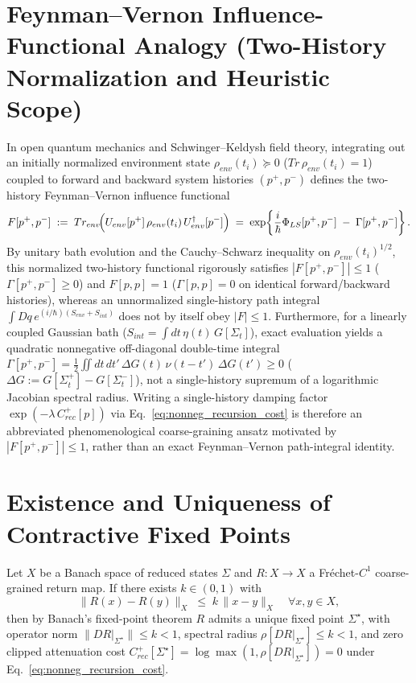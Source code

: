 \documentclass[american,11pt,letterpaper]{article}
\def\mathcal#1{#1}%
\def\mathrm#1{#1}%
\def\emph#1{#1}%
\begin{document}
\section{Feynman--Vernon Influence-Functional Analogy (Two-History Normalization and Heuristic Scope)}
\label{appendix:FV-recursion}
In open quantum mechanics and Schwinger--Keldysh field theory, integrating out an initially normalized environment state $\rho_{\mathrm{env}}(t_i) \succeq 0$ ($\mathrm{Tr}\,\rho_{\mathrm{env}}(t_i) = 1$) coupled to forward and backward system histories $(p^+, p^-)$ defines the \emph{two-history} Feynman--Vernon influence functional
\[
\mathcal{F}[p^+, p^-] \;:=\; \mathrm{Tr}_{\mathrm{env}}\!\Bigl(U_{\mathrm{env}}[p^+]\,\rho_{\mathrm{env}}(t_i)\,U_{\mathrm{env}}^\dagger[p^-]\Bigr)
\;=\; \exp\!\left\{\frac{i}{\hbar}\Phi_{\mathrm{LS}}[p^+, p^-] \;-\; \Gamma[p^+, p^-]\right\}.
\]
By unitary bath evolution and the Cauchy--Schwarz inequality on $\rho_{\mathrm{env}}(t_i)^{1/2}$, this normalized two-history functional rigorously satisfies $|\mathcal{F}[p^+, p^-]| \le 1$ ($\Gamma[p^+, p^-] \ge 0$) and $\mathcal{F}[p, p] = 1$ ($\Gamma[p, p] = 0$ on identical forward/backward histories), whereas an unnormalized single-history path integral $\int\mathcal{D}q\,e^{(i/\hbar)(S_{\mathrm{env}}+S_{\mathrm{int}})}$ does not by itself obey $|\mathcal{F}| \le 1$. Furthermore, for a linearly coupled Gaussian bath ($S_{\mathrm{int}} = \int dt\,\eta(t)\,G[\Sigma_t]$), exact evaluation yields a \emph{quadratic nonnegative off-diagonal double-time integral} $\Gamma[p^+, p^-] = \frac{1}{2}\iint dt\,dt'\,\Delta G(t)\,\nu(t-t')\,\Delta G(t') \ge 0$ ($\Delta G := G[\Sigma_t^+] - G[\Sigma_t^-]$), not a single-history supremum of a logarithmic Jacobian spectral radius. Writing a single-history damping factor $\exp(-\lambda\,C_{\mathrm{rec}}^+[p])$ via Eq.~\eqref{eq:nonneg_recursion_cost} is therefore an abbreviated phenomenological coarse-graining ansatz motivated by $|\mathcal{F}[p^+, p^-]| \le 1$, rather than an exact Feynman--Vernon path-integral identity.

\section{Existence and Uniqueness of Contractive Fixed Points}
\label{sec:fixed-point}
\label{app:clean-recursion}
Let $X$ be a Banach space of reduced states $\Sigma$ and $\mathcal{R}:X\to X$ a Fr\'echet-$C^1$ coarse-grained return map. If there exists $k\in(0,1)$ with
\[
\|\mathcal{R}(x) - \mathcal{R}(y)\|_X \;\le\; k\,\|x - y\|_X \quad\forall x,y\in X,
\]
then by Banach's fixed-point theorem $\mathcal{R}$ admits a unique fixed point $\Sigma^\star$, with operator norm $\|D\mathcal{R}|_{\Sigma^\star}\| \le k < 1$, spectral radius $\rho[D\mathcal{R}|_{\Sigma^\star}] \le k < 1$, and zero clipped attenuation cost $C_{\mathrm{rec}}^+[\Sigma^\star] = \log\max(1, \rho[D\mathcal{R}|_{\Sigma^\star}]) = 0$ under Eq.~\eqref{eq:nonneg_recursion_cost}.
\end{document}
